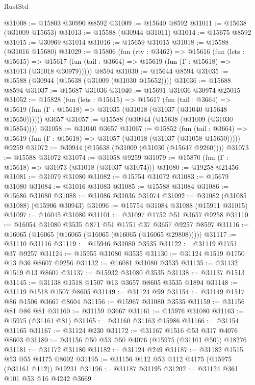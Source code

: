 \begin{lexlean}{RustStd}
\begin{coremodule}
@31008 := @15803 @30990 @8592
@31009 := @15640 @8592
@31011 := @15638 (@31009 @15653)
@31013 := @15588 (@30944 @31011)
@31014 := @15675 @8592
@31015 := @30969 @31014
@31016 := @15659 @31015
@31018 := @15588 (@31016 @15680)
@31029 := @15806
    (fun (rty : @3462) =>
    @15616
      (fun (lets : @15615) =>
      @15617 (fun (tail : @3664) => @15619 (fun (Γ : @15618) => @31013 (@31018 @30979)))))
    @8594
@31030 := @15644 @8594
@31035 := @15588 (@30944 (@15638 (@31009 (@31030 @15652))))
@31036 := @15688 @8594
@31037 := @15687 @31036
@31040 := @15691 @31036 @30974 @25015
@31052 := @15828
    (fun (lets : @15615) =>
    @15617
      (fun (tail : @3664) =>
      @15619 (fun (Γ : @15618) => @31035 (@31018 (@31037 (@31040 @15648 @15650))))))
    @3657
@31057 := @15588 (@30944 (@15638 (@31009 (@31030 @15854))))
@31058 := @31040 @3657
@31067 := @15852
    (fun (tail : @3664) => @15619 (fun (Γ : @15618) => @31057 (@31018 (@31037 (@31058 @15650)))))
    @9259
@31072 := @30944 (@15638 (@31009 (@31030 (@15647 @9260))))
@31073 := @15588 @31072
@31074 := @31058 @9259
@31079 := @15870 (fun (Γ : @15618) => @31073 (@31018 (@31037 @31074)))
@31080 := @19258 @21456
@31081 := @31079 @31080
@31082 := @15754 @31072
@31083 := @15679 @31080
@31084 := @31016 @31083
@31085 := @15588 @31084
@31086 := @15686 @31080
@31088 := @31086 @31036 @31074
@31092 := @31082 (@31085 @31088) (@15906 @30943)
@31096 := @15754 @31084 @31088 (@15911 @31015)
@31097 := @16045 @31080
@31101 := @31097 @1752 @51 @3657 @9258
@31110 := @16054 @31080 @3535 @871 @51 @1751 @37 @3657 @9257 @8597
@31116 := @16065 (@16065 (@16065 (@16065 (@16065 (@16065 @29808)))))
@31117 := @31110 @31116
@31119 := @15946 @31080 @3535
@31122 := @31119 @1751 @37 @9257
@31124 := @15955 @31080 @3535
@31130 := @31124 @1519 @1750 @13 @36 @8607 @9256
@31132 := @16081 @31080 @3535
@31135 := @31132 @1519 @13 @8607
@31137 := @15932 @31080 @3535
@31138 := @31137 @1513
@31145 := @31138 @1518 @1507 @13 @3657 @8605 @3535 @1894
@31148 := @31119 @1518 @1507 @8605
@31149 := @31124 @99
@31154 := @31149 @1517 @86 @1506 @3667 @8604
@31156 := @15967 @31080 @3535
@31159 := @31156 @81 @86 @81
@31160 := @31159 @3667
@31161 := @15976 @31080
@31163 := @15975 (@31161 @81)
@31165 := @31160 @31163 @15986
@31166 := @31154 @31165
@31167 := @31124 @230
@31172 := @31167 @1516 @53 @317 @4076 @8603
@31180 := @31156 @50 @53 @50 @4076 (@15975 (@31161 @50)) @18276
@31181 := @31172 @31180
@31182 := @31124 @249
@31187 := @31182 @1515 @53 @55 @4175 @8602
@31195 := @31156 @112 @53 @112 @4175 (@15975 (@31161 @112)) @19231
@31196 := @31187 @31195
@31202 := @31124 @361 @101 @53 @16 @4242 @3669

\end{coremodule}
\end{lexlean}
